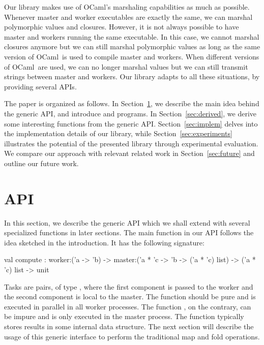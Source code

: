 \documentclass[a4paper,12pt]{article}
\newcommand{\Ocaml}{OCaml}
\begin{document}
Our library makes use of \Ocaml's marshaling capabilities as much as
possible. Whenever master and worker executables are exactly the same,
we can marshal polymorphic values and closures. However, it is not
always possible to have master and workers running the same
executable. In this case, we cannot marshal closures anymore but we
can still marshal polymorphic values as long as the same version of
\Ocaml\ is used to compile master and workers. When different versions
of \Ocaml\ are used, we can no longer marshal values but we can still
transmit strings between master and workers. Our library adapts to all
these situations, by providing several APIs.

\medskip
The paper is organized as follows. In Section~\ref{sec:API}, we
describe the main idea behind the generic API, and introduce
 and  programs. 
In Section~\ref{sec:derived}, we
derive some interesting functions from the generic
API. Section~\ref{sec:implem} delves into the implementation details
of our library, while Section~\ref{sec:experiments} illustrates the
potential of the presented library through experimental evaluation. We
compare our approach with relevant related work in
Section~\ref{sec:future} and outline our future work.

\section{API}\label{sec:API}
In this section, we describe the
generic API which we shall extend with several specialized
functions in later sections. The main function in our API follows the idea
sketched in the introduction. It has the following signature:
\begin{ocaml}
  val compute : 
    worker:('a -> 'b) -> 
    master:('a * 'c -> 'b -> ('a * 'c) list) -> 
    ('a * 'c) list -> unit
\end{ocaml}
Tasks are pairs, of type , where the first component is
passed to the worker and the second component is local to the master.
The  function should be pure and is executed in parallel
in all worker processes. The function , on the
contrary, can be impure and is only executed in the master process.
The  function typically stores results 
in some internal data structure.
The next section will describe the usage of this generic interface to
perform the traditional map and fold operations.
\end{document}
